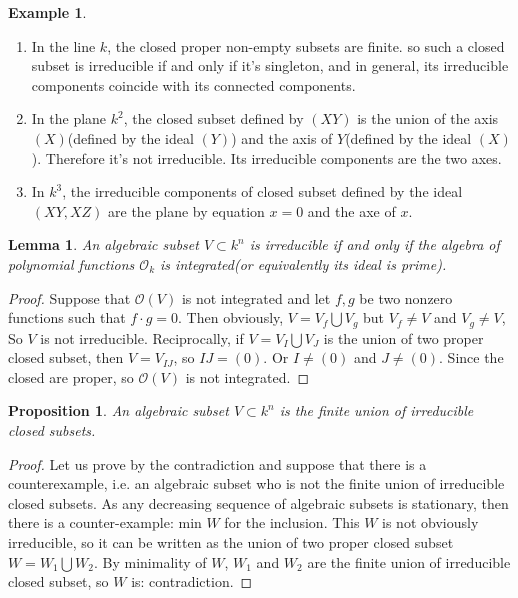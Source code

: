\documentclass[12pt,a4paper,english]{article}
\theoremstyle{plain}
\newtheorem{lem}[thm]{Lemma}
\newtheorem{prop}[thm]{Proposition}
\theoremstyle{definition}
\newtheorem*{example}{Example}
\theoremstyle{remark}
\begin{document}
\begin{example}
\begin{enumerate}
    \item In the line $k$, the closed proper non-empty subsets are finite. so such a closed subset is irreducible if and only if it's singleton, and in general, its irreducible components coincide with its connected components. 
    \item In the plane $k^{2}$, the closed subset defined by $(XY)$ is the union of the axis $(X)$(defined by the ideal $(Y)$) and the axis of $Y$(defined by the ideal $(X)$). Therefore it's not irreducible. Its irreducible components are the two axes.
    \item In $k^{3}$, the irreducible components of closed subset defined by the ideal $(XY, XZ)$ are the plane by equation $x=0$ and the axe of $x$.
\end{enumerate}
\end{example}
\begin{lem}
An algebraic subset $V\subset k^{n}$ is irreducible if and only if the algebra of polynomial functions $\mathcal{O}_{k}$ is integrated(or equivalently its ideal is prime). 
\end{lem}
\begin{proof}
Suppose that $\mathcal{O}(V)$ is not integrated and let $f,g$ be two nonzero functions such that $f\cdot g=0$. Then obviously, $V= V_{f}\bigcup V_{g}$ but $V_{f}\not= V$ and $V_{g}\not=V$, So $V$ is not irreducible. Reciprocally, if $V=V_{I}\bigcup V_{J}$ is the union of two proper closed subset, then $V=V_{IJ}$, so $IJ=(0)$. Or $I\not=(0)$ and $J\not=(0)$. Since the closed are proper, so $\mathcal{O}(V)$ is not integrated.    
\end{proof}
\begin{prop}
An algebraic subset $V\subset k^{n}$ is the finite union of irreducible closed subsets. 
\end{prop}
\begin{proof}
Let us prove by the contradiction and suppose that there is a counterexample, i.e. an algebraic subset who is not the finite union of irreducible closed subsets. As any decreasing sequence of algebraic subsets is stationary, then there is a counter-example: min $W$ for the inclusion. This $W$ is not obviously irreducible, so it can be written as the union of two proper closed subset $W=W_{1}\bigcup W_{2}$. By minimality of $W$, $W_{1}$ and $W_{2}$ are the finite union of irreducible closed subset, so $W$ is: contradiction.
\end{proof}
\end{document}
